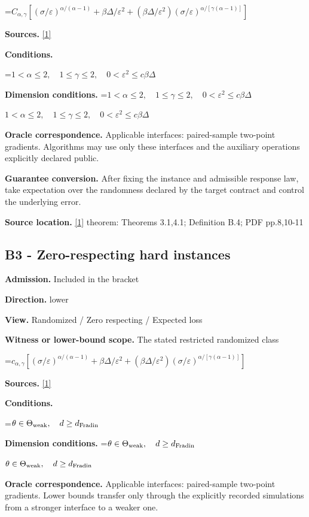 \documentclass[10pt,a4paper]{article}
\newcommand{\AtlasMath}[1]{\par\begingroup\centering\setbox0=\hbox{$\displaystyle #1$}\ifdim\wd0>1.4\linewidth\typeout{ATLAS WIDE FORMULA: \the\wd0}\fi\ifdim\wd0>\linewidth\resizebox{\linewidth}{!}{\box0}\else\box0\fi\par\endgroup}
\newcommand{\AtlasInlineMath}[1]{\begingroup\setbox0=\hbox{$#1$}\ifdim\wd0>.4\linewidth\endgroup\AtlasMath{#1}\else\endgroup$#1$\fi}
\begin{document}
\AtlasMath{C_{\alpha,\gamma}[(\sigma/\varepsilon)^{\alpha/(\alpha-1)}+\beta\Delta/\varepsilon^2+(\beta\Delta/\varepsilon^2)(\sigma/\varepsilon)^{\alpha/[\gamma(\alpha-1)]}]}
\textbf{Sources.} \href{https://arxiv.org/pdf/2512.18713}{[1]}

\textbf{Conditions.} 
\AtlasMath{1<\alpha\le2,\quad1\le\gamma\le2,\quad0<\varepsilon^2\le c\beta\Delta}


\textbf{Dimension conditions.} \AtlasInlineMath{1<\alpha\le2,\quad1\le\gamma\le2,\quad0<\varepsilon^2\le c\beta\Delta}

\textbf{Oracle correspondence.} Applicable interfaces: paired-sample two-point gradients. Algorithms may use only these interfaces and the auxiliary operations explicitly declared public.

\textbf{Guarantee conversion.} After fixing the instance and admissible response law, take expectation over the randomness declared by the target contract and control the underlying error.

\textbf{Source location.} \href{https://arxiv.org/pdf/2512.18713}{[1]} theorem: Theorems 3.1,4.1; Definition B.4; PDF pp.8,10-11

\subsection{B3 - Zero-respecting hard instances}
\textbf{Admission.} Included in the bracket

\textbf{Direction.} lower

\textbf{View.} Randomized / Zero respecting / Expected loss

\textbf{Witness or lower-bound scope.} The stated restricted randomized class

\AtlasMath{c_{\alpha,\gamma}[(\sigma/\varepsilon)^{\alpha/(\alpha-1)}+\beta\Delta/\varepsilon^2+(\beta\Delta/\varepsilon^2)(\sigma/\varepsilon)^{\alpha/[\gamma(\alpha-1)]}]}
\textbf{Sources.} \href{https://arxiv.org/pdf/2512.18713}{[1]}

\textbf{Conditions.} 
\AtlasMath{\theta\in\Theta_{\rm weak},\quad d\ge d_{\rm Fradin}}


\textbf{Dimension conditions.} \AtlasInlineMath{\theta\in\Theta_{\rm weak},\quad d\ge d_{\rm Fradin}}

\textbf{Oracle correspondence.} Applicable interfaces: paired-sample two-point gradients. Lower bounds transfer only through the explicitly recorded simulations from a stronger interface to a weaker one.
\end{document}
